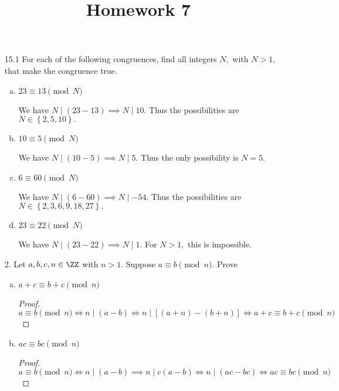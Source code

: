 \documentclass{article}
\begin{document}
\title{Homework 7}
\maketitle
\thispagestyle{fancy}

\begin{itemize}
	\item[15.1] For each of the following congruences, find all integers $N,$ with $N>1,$ that make the congruence true.
		\begin{enumerate}[(a)]
			\item $23\equiv 13\pmod N$
				\begin{soln}
					We have $N\mid(23-13)\implies N\mid 10.$ Thus the possibilities are $N\in \left\{ 2, 5, 10 \right\}.$
				\end{soln}

			\item $10\equiv 5\pmod N$
				\begin{soln}
					We have $N\mid (10-5)\implies N\mid 5.$ Thus the only possibility is $N=5.$
				\end{soln}

			\item $6\equiv 60\pmod N$
				\begin{soln}
					We have $N\mid (6-60)\implies N\mid -54.$ Thus the possibilities are $N\in\left\{ 2, 3, 6, 9, 18, 27 \right\}.$
				\end{soln}

			\item $23\equiv 22\pmod N$
				\begin{soln}
					We have $N\mid (23-22)\implies N\mid 1.$ For $N>1,$ this is impossible.
				\end{soln}

		\end{enumerate}

	\item[2.] Let $a, b, c, n\in\ZZ$ with $n>1.$ Suppose $a\equiv b\pmod n.$ Prove
		\begin{enumerate}[(a)]
			\item $a+c\equiv b+c\pmod n$
				\begin{proof}
					\[a\equiv b\pmod n \iff n\mid(a-b)\iff n\mid \left[ (a+n)-(b+n) \right]\iff a+c\equiv b+c\pmod n\]
				\end{proof}

			\item $ac\equiv bc\pmod n$
				\begin{proof}
					\[a\equiv b\pmod n \iff n\mid(a-b)\implies n\mid c(a-b)\iff n\mid(ac-bc)\iff ac\equiv bc\pmod n\]
				\end{proof}
				

\end{enumerate}
\end{itemize}
\end{document}

